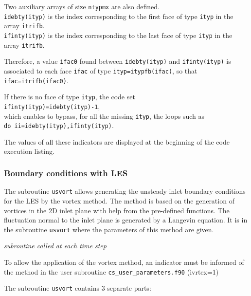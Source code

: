 {{{Two auxiliary arrays of size \texttt{ntypmx} are also defined.\\
\texttt{idebty(ityp)} is the index
corresponding to the first
face of type \texttt{ityp} in the array \texttt{itrifb}.\\
\texttt{ifinty(ityp)} is the index
corresponding to the last
face of type \texttt{ityp} in the array \texttt{itrifb}.

Therefore, a value \texttt{ifac0} found between \texttt{idebty(ityp)} and
\texttt{ifinty(ityp)} is associated to each face \texttt{ifac} of type
\texttt{ityp=itypfb(ifac)}, so that \texttt{ifac=itrifb(ifac0)}.

If there is no face of type \texttt{ityp}, the code set \\
\texttt{ifinty(ityp)=idebty(ityp)-1},\\
which enables to bypass, for all the missing \texttt{ityp}, the loops such as \\
\texttt{do ii=idebty(ityp),ifinty(ityp)}.

The values of all these indicators are displayed at the beginning of the
code execution listing.

\subsubsection[Boundary conditions with LES]
{Boundary conditions with LES}
\label{sec:prg_usvort}%
The subroutine \texttt{usvort} allows generating the unsteady inlet boundary
conditions for the LES by the vortex method. The method is based on
 the generation of vortices in the 2D inlet plane with help from
the pre-defined functions. The fluctuation normal to the inlet plane
is generated by a Langevin equation. It is in the subroutine \texttt{usvort}
 where the parameters of this method are given.

\noindent
\textit{subroutine called at each time step}

To allow the application of the vortex method, an indicator must be informed of
the method in the user subroutine \texttt{cs\_user\_parameters.f90} (ivrtex=1)

The subroutine \texttt{usvort} contains 3 separate parts:

}}}
